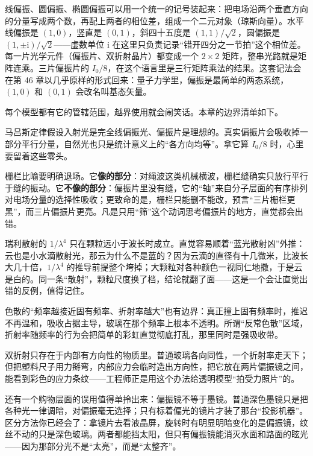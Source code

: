 \begin{challenge}
线偏振、圆偏振、椭圆偏振可以用一个统一的记号装起来：把电场沿两个垂直方向的分量写成两个数，再配上两者的相位差，组成一个二元对象（琼斯向量）。水平线偏振是 \((1,0)\)，竖直是 \((0,1)\)，斜四十五度是 \((1,1)/\sqrt{2}\)，圆偏振是 \((1,\pm\mathrm{i})/\sqrt{2}\)——虚数单位 \(\mathrm{i}\) 在这里只负责记录“错开四分之一节拍”这个相位差。每一片光学元件（偏振片、双折射晶片）都变成一个 \(2\times2\) 矩阵，整串光路就是矩阵连乘。三片偏振片的 \(I_0/8\)，在这个语言里是三行矩阵乘法的结果。这套记法会在第 46 章以几乎原样的形式回来：量子力学里，偏振是最简单的两态系统，\((1,0)\) 和 \((0,1)\) 会改名叫基态矢量。
\end{challenge}


每个模型都有它的管辖范围，越界使用就会闹笑话。本章的边界清单如下。

马吕斯定律假设入射光是完全线偏振光、偏振片是理想的。真实偏振片会吸收掉一部分平行分量，自然光也只是统计意义上的“各方向均等”。拿它算 \(I_0/8\) 时，心里要留着这些零头。

栅栏比喻要明确退场。它\textbf{像的部分}：对绳波这类机械横波，栅栏缝确实只放行平行于缝的振动。它\textbf{不像的部分}：偏振片里没有缝，它的“轴”来自分子层面的有序排列对电场分量的选择性吸收；更致命的是，栅栏只能删不能改，预言“三片栅栏更黑”，而三片偏振片更亮。凡是只用“筛”这个动词思考偏振片的地方，直觉都会出错。

瑞利散射的 \(1/\lambda^4\) 只在颗粒远小于波长时成立。直觉容易顺着“蓝光散射凶”外推：云也是小水滴散射光，那云为什么不是蓝的？因为云滴的直径有十几微米，比波长大几十倍，\(1/\lambda^4\) 的推导前提整个垮掉；大颗粒对各种颜色一视同仁地撒，于是云是白的。同一条“散射”，颗粒尺度换了档，结论就翻了面——这是一个会让直觉出错的反例，值得记住。

色散的“频率越接近固有频率、折射率越大”也有边界：真正撞上固有频率时，推迟不再温和，吸收占据主导，玻璃在那个频率上根本不透明。所谓“反常色散”区域，折射率随频率的行为会把简单的彩虹直觉彻底打乱，那里同时是强吸收带。

双折射只存在于内部有方向性的物质里。普通玻璃各向同性，一个折射率走天下；但把塑料尺子用力掰弯，内部应力会临时造出方向性，把它放在两片偏振镜之间，能看到彩色的应力条纹——工程师正是用这个办法给透明模型“拍受力照片”的。

还有一个购物层面的误用值得单拎出来：偏振镜不等于墨镜。普通深色墨镜只是把各种光一律调暗，对偏振毫无选择；只有标着偏光的镜片才装了那台“投影机器”。区分方法你已经会了：拿镜片去看液晶屏，旋转时有明显明暗变化的是偏振镜，纹丝不动的只是深色玻璃。两者都能挡太阳，但只有偏振镜能消灭水面和路面的眩光——因为那部分光不是“太亮”，而是“太整齐”。


